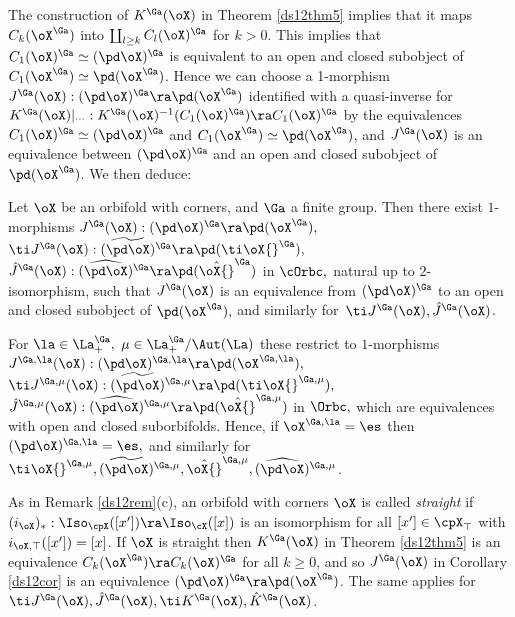 \documentclass{article}
\begin{document}
The construction of $K^\Ga(\oX)$ in Theorem \ref{ds12thm5} implies
that it maps $C_k(\oX^\Ga)$ into $\coprod_{l\ge k}C_l(\oX)^\Ga$ for
$k>0$. This implies that $C_1(\oX)^\Ga\simeq(\pd\oX)^\Ga$ is
equivalent to an open and closed subobject of $C_1(\oX^\Ga)\simeq
\pd(\oX^\Ga)$. Hence we can choose a 1-morphism
$J^\Ga(\oX):(\pd\oX)^\Ga\ra \pd(\oX^\Ga)$ identified with a
quasi-inverse for $K^\Ga(\oX)\vert_{\cdots}:
K^\Ga(\oX)^{-1}(C_1(\oX)^\Ga)\ra C_1(\oX)^\Ga$ by the equivalences
$C_1(\oX)^\Ga\simeq(\pd\oX)^\Ga$ and $C_1(\oX^\Ga)\simeq
\pd(\oX^\Ga)$, and $J^\Ga(\oX)$ is an equivalence between
$(\pd\oX)^\Ga$ and an open and closed subobject of $\pd(\oX^\Ga)$.
We then deduce:

\begin{cor} Let\/ $\oX$ be an orbifold with corners, and\/ $\Ga$ a
finite group. Then there exist\/ $1$-morphisms
$J^\Ga(\oX):(\pd\oX)^\Ga\ra \pd(\oX^\Ga),$ $\ti J{}^\Ga(\oX):
\,\,\,\,\widetilde{\!\!\!\!(\pd\oX)\!\!\!\!}\,\,\,\,^\Ga\ra
\pd(\ti\oX{}^\Ga),$ $\hat J{}^\Ga(\oX):\,\,\,\,\widehat{\!\!\!\!
(\pd\oX)\!\!\!\!}\,\,\,\,^\Ga\ra \pd(\hat\oX{}^\Ga)$ in\/ $\cOrbc,$
natural up to\/ $2$-isomorphism, such that\/ $J^\Ga(\oX)$ is an
equivalence from $(\pd\oX)^\Ga$ to an open and closed subobject of\/
$\pd(\oX^\Ga),$ and similarly for\/~$\ti J{}^\Ga(\oX),\hat
J{}^\Ga(\oX)$.

For $\la\in\La^\Ga_+,$ $\mu\in\La^\Ga_+/\Aut(\La)$ these restrict to
$1$-morphisms $J^{\Ga,\la}(\oX):(\pd\oX)^{\Ga,\la} \ra
\pd(\oX^{\Ga,\la}),$ $\ti J{}^{\Ga,\mu}(\oX):
\,\,\,\,\widetilde{\!\!\!\!(\pd\oX)\!\!\!\!}\,\,\,\,^{\Ga,\mu}\ra
\pd(\ti\oX{}^{\Ga,\mu}),$ $\hat
J{}^{\Ga,\mu}(\oX):\,\,\,\,\widehat{\!\!\!\!
(\pd\oX)\!\!\!\!}\,\,\,\,^{\Ga,\mu}\ra \pd(\hat\oX{}^{\Ga,\mu})$
in\/ $\Orbc,$ which are equivalences with open and closed
suborbifolds. Hence, if\/ $\oX^{\Ga,\la}=\es$ then
$(\pd\oX)^{\Ga,\la}=\es,$ and similarly for $\ti\oX{}^{\Ga,\mu},
\,\,\,\,\widetilde{\!\!\!\!(\pd\oX)\!\!\!\!}\,\,\,\,^{\Ga,\mu},
\hat\oX{}^{\Ga,\mu},\,\,\,\,\widehat{\!\!\!\!
(\pd\oX)\!\!\!\!}\,\,\,\,^{\Ga,\mu}$.
\label{ds12cor}
\end{cor}

As in Remark \ref{ds12rem}(c), an orbifold with corners $\oX$ is
called {\it straight\/} if
$(i_\oX)_*:\Iso_\cpX([x'])\ra \Iso_\cX([x])$ is an isomorphism for
all $[x']\in\cpX_\top$ with $i_{\oX,\top}([x'])=[x]$. If $\oX$ is
straight then $K^\Ga(\oX)$ in Theorem \ref{ds12thm5} is an
equivalence $C_k(\oX^\Ga)\ra C_k(\oX)^\Ga$ for all $k\ge 0$, and so
$J^\Ga(\oX)$ in Corollary \ref{ds12cor} is an equivalence
$(\pd\oX)^\Ga\ra \pd(\oX^\Ga)$. The same applies for~$\ti
J{}^\Ga(\oX),\hat J{}^\Ga(\oX),\ti K{}^\Ga(\oX),\hat K{}^\Ga(\oX)$.
\end{document}
